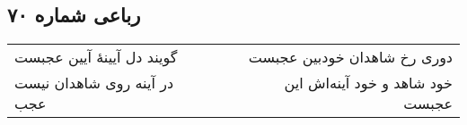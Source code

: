 \begin{center}
\section*{رباعی شماره ۷۰}
\label{sec:sh070}
\begin{longtable}{l p{0.5cm} r}
گویند دل آیینهٔ آیین عجبست
&&
دوری رخ شاهدان خودبین عجبست
\\
در آینه روی شاهدان نیست عجب
&&
خود شاهد و خود آینه‌اش این عجبست
\\
\end{longtable}
\end{center}
